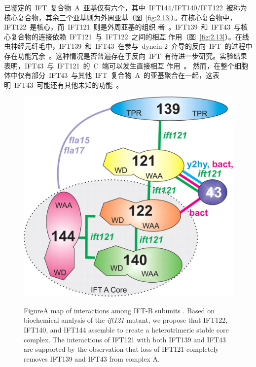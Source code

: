 已鉴定的\ IFT\ 复合物\ A\ 亚基仅有六个，其中\ IFT144/IFT140/IFT122\ 被称为核心复合物，其余三个亚基则为外周亚基（图\ \ref{fig:2.13}）。在核心复合物中，IFT122\ 是核心，而\ IFT121\ 则是外周亚基的组织
者\ \citep{Zhu2017}。IFT139\ 和\ IFT43\ 与核心复合物的连接依赖\ IFT121\ 与\ IFT122\ 之间的相互
作用（图\ \ref{fig:2.13}）\citep{Behal2012}。在线虫神经元纤毛中，IFT139\ 和\ IFT43\ 在参与\ dynein-2\ 介导的反向\ IFT\ 的过程中存在功能冗余\ \citep{Yi2017}。这种情况是否普遍存在于反向\ IFT\ 有待进一步研究。实验结果表明，IFT43\ 与\ IFT121\ 的\ C\ 端可以发生直接相互
作用\ \citep{Behal2012}。 然而，在整个细胞体中仅有部分\ IFT43\ 与其他\ IFT\ 复合物\ A\ 的亚基聚合在一起，这表明\ IFT43\ 可能还有其他未知的功能\ \citep{Behal2012,Zhu2017}。

\begin{figure}[htb]
\centering
\graphicspath{{figures/}}
\includegraphics[width=\textwidth-60mm]{fig2-13.jpg}
{
 {Figure}{A map of interactions among IFT-B subunits \citep{Behal2012}. Based on biochemical analysis of the \textit{ift121} mutant, we propose that IFT122, IFT140, and IFT144 assemble to create a heterotrimeric stable core complex. The interactions of IFT121 with both IFT139 and IFT43 are supported by the observation that loss of IFT121 completely removes IFT139 and IFT43 from complex A.}
\par}
\end{figure}

